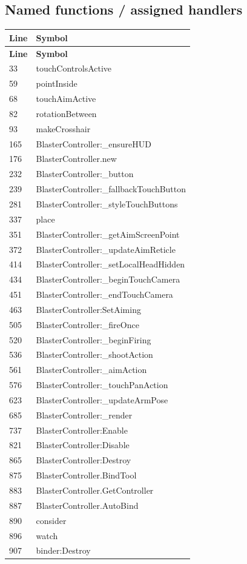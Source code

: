 \subsection{Named functions /\allowbreak{} assigned handlers}
\begin{longtable}{p{}p{}}
\toprule
\textbf{Line} & \textbf{Symbol} \\ \midrule
\endfirsthead
\textbf{Line} & \textbf{Symbol} \\ \midrule
\endhead
33 & touchControlsActive \\
59 & pointInside \\
68 & touchAimActive \\
82 & rotationBetween \\
93 & makeCrosshair \\
165 & BlasterController:\_\allowbreak{}ensureHUD \\
176 & BlasterController.\allowbreak{}new \\
232 & BlasterController:\_\allowbreak{}button \\
239 & BlasterController:\_\allowbreak{}fallbackTouchButton \\
281 & BlasterController:\_\allowbreak{}styleTouchButtons \\
337 & place \\
351 & BlasterController:\_\allowbreak{}getAimScreenPoint \\
372 & BlasterController:\_\allowbreak{}updateAimReticle \\
414 & BlasterController:\_\allowbreak{}setLocalHeadHidden \\
434 & BlasterController:\_\allowbreak{}beginTouchCamera \\
451 & BlasterController:\_\allowbreak{}endTouchCamera \\
463 & BlasterController:SetAiming \\
505 & BlasterController:\_\allowbreak{}fireOnce \\
520 & BlasterController:\_\allowbreak{}beginFiring \\
536 & BlasterController:\_\allowbreak{}shootAction \\
561 & BlasterController:\_\allowbreak{}aimAction \\
576 & BlasterController:\_\allowbreak{}touchPanAction \\
623 & BlasterController:\_\allowbreak{}updateArmPose \\
685 & BlasterController:\_\allowbreak{}render \\
737 & BlasterController:Enable \\
821 & BlasterController:Disable \\
865 & BlasterController:Destroy \\
875 & BlasterController.\allowbreak{}BindTool \\
883 & BlasterController.\allowbreak{}GetController \\
887 & BlasterController.\allowbreak{}AutoBind \\
890 & consider \\
896 & watch \\
907 & binder:Destroy \\
\bottomrule
\end{longtable}
